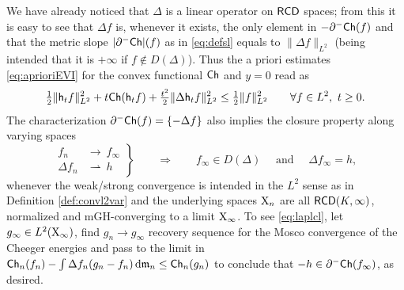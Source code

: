 \documentclass[11pt]{article}
\numberwithin{equation}{section}
\newcommand{\X}{{\rm X}}
\newcommand{\mm}{{\mathfrak m}}
\newcommand{\RCD}{{\sf RCD}}
\newcommand{\ch}{{\sf Ch}}
\renewcommand{\d}{{\rm d}}
\newcommand{\weakto}{\rightharpoonup}
\newcommand{\h}{{\sf h}} %
\begin{document}
We have already noticed that $\Delta$ is a linear operator on $\RCD$ spaces; from this it is easy to see that $\Delta f$ is, whenever it exists, the only element in $-\partial^-\ch(f)$ and that the metric slope $|\partial^-\ch|(f)$ as in \eqref{eq:defsl} equals to $\|\Delta f\|_{L^2}$ (being intended that it is $+\infty$ if $f\notin D(\Delta)$).  Thus the a priori estimates \eqref{eq:aprioriEVI} for the convex functional $\ch$ and $y=0$ read as
\begin{equation}
\label{eq:aprioriheat}
\tfrac12\|\h_tf\|_{L^2}^2+t\ch(\h_tf)+\tfrac{t^2}2\|\Delta \h_tf\|^2_{L^2}\leq \tfrac12\|f\|_{L^2}^2\qquad\forall f\in L^2,\ t\geq 0.
\end{equation}
The characterization  $\partial^-\ch(f)=\{-\Delta f\}$ also implies the closure property along varying spaces
\begin{equation}
\label{eq:laplcl}
\left.\begin{array}{rl}
f_n&\to\ f_\infty\\
\Delta f_n&\weakto\ h
\end{array}\right\}\qquad\Rightarrow\qquad f_\infty\in D(\Delta)\quad\text{ and }\quad\Delta f_\infty=h,
\end{equation}
whenever the weak/strong convergence is intended in the $L^2$ sense as in Definition \ref{def:convl2var} and the underlying spaces $\X_n$ are all $\RCD(K,\infty)$, normalized and mGH-converging to a limit $\X_\infty$. To see \eqref{eq:laplcl}, let $g_\infty\in L^2(\X_\infty)$, find $g_n\to g_\infty$ recovery sequence for the Mosco convergence of the Cheeger energies and pass to the limit in $\ch_n(f_n)-\int\Delta f_n(g_n-f_n)\,\d\mm_n \leq \ch_n(g_n)$ to conclude that $-h\in\partial^-\ch(f_\infty)$, as desired.
\end{document}
